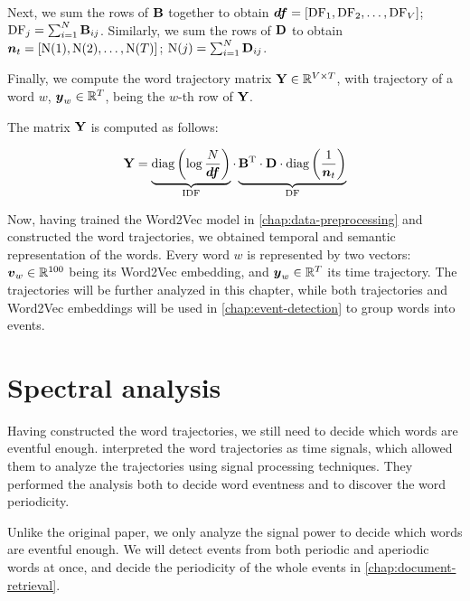 Next, we sum the rows of $\mathbf{B}$ together to obtain $\vect{\df} = \left[ \text{\df}_{1}, \text{\df}_{2}, \dots, \text{\df}_{\featcount} \right]$; $\text{DF}_{j} = \sum_{i = 1}^{N}{\mathbf{B}_{ij}}$. Similarly, we sum the rows of $\mathbf{D}$ to obtain $\vect{\doccount}_{t} = \left[ \text{\doccount}(1), \text{\doccount}(2), \dots, \text{\doccount}(\streamlen) \right]$; $\text{N}(j) = \sum_{i = 1}^{N}{\mathbf{D}_{ij}}$.

Finally, we compute the word trajectory matrix $\mathbf{Y} \in \mathbb{R}^{V \times T}$, with trajectory of a word $w$, $\vect{\traj}_w \in \R^{\streamlen}$, being the $w$-th row of $\mathbf{Y}$.

The matrix $\mathbf{Y}$ is computed as follows:

\begin{equation}
	\trajmat =
		\underbrace{\text{diag} \left( \log{\frac{\doccount}{\vect{\df}}} \right)}_{\text{IDF}}
		\cdot
		\underbrace{\bowmat^{\T}
		\cdot \dtdmat
		\cdot \text{diag} \left( \frac{1}{\vect{\doccount}_{t}} \right)}_{\text{DF}}
\end{equation}

Now, having trained the Word2Vec model in \autoref{chap:data-preprocessing} and constructed the word trajectories, we obtained temporal and semantic representation of the words. Every word $w$ is represented by two vectors: $\embed_{w} \in \R^{100}$ being its Word2Vec embedding, and $\vect{\traj}_{w} \in \R^{\streamlen}$ its time trajectory. The trajectories will be further analyzed in this chapter, while both trajectories and Word2Vec embeddings will be used in \autoref{chap:event-detection} to group words into events.


\section{Spectral analysis} \label{sec:spectral-analysis}
Having constructed the word trajectories, we still need to decide which words are eventful enough. \cite{event-detection} interpreted the word trajectories as time signals, which allowed them to analyze the trajectories using signal processing techniques. They performed the analysis both to decide word eventness and to discover the word periodicity.

Unlike the original paper, we only analyze the signal power to decide which words are eventful enough. We will detect events from both periodic and aperiodic words at once, and decide the periodicity of the whole events in \autoref{chap:document-retrieval}.

